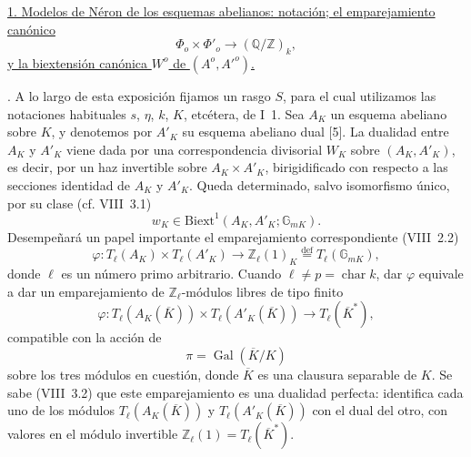 \par\medskip
\noindent
\underline{1. Modelos de Néron de los esquemas abelianos: notación; el
emparejamiento canónico}
\[
 \Phi_o\times\Phi'_o\longrightarrow(\mathbb Q/\mathbb Z)_k,
\]
\underline{y la biextensión canónica $W^o$ de $(A^o,{A'}^o)$.}

\medskip
{}. A lo largo de esta exposición fijamos un rasgo $S$, para el cual
utilizamos las notaciones habituales $s$, $\eta$, $k$, $K$, etcétera,
de I~1. Sea $A_K$ un esquema abeliano sobre $K$, y denotemos por $A'_K$
su esquema abeliano dual [5]. La dualidad entre $A_K$ y $A'_K$ viene
dada por una correspondencia divisorial $W_K$ sobre $(A_K,A'_K)$, es
decir, por un haz invertible sobre $A_K\times A'_K$, birigidificado con
respecto a las secciones identidad de $A_K$ y $A'_K$. Queda determinado,
salvo isomorfismo único, por su clase (cf. VIII~3.1)
\begin{equation}\tag{1.0.1}
 w_K\in\mathrm{Biext}^1(A_K,A'_K;\mathbb G_{mK}).
\end{equation}
Desempeñará un papel importante el emparejamiento correspondiente
(VIII~2.2)
\begin{equation}\tag{1.0.2}
 \varphi:T_\ell(A_K)\times T_\ell(A'_K)
 \longrightarrow\mathbb Z_\ell(1)_K
 \overset{\mathrm{def}}{=}T_\ell(\mathbb G_{mK}),
\end{equation}
donde $\ell$ es un número primo arbitrario. Cuando
$\ell\ne p=\operatorname{char}k$, dar $\varphi$ equivale a dar un
emparejamiento de $\mathbb Z_\ell$-módulos libres de tipo finito
\begin{equation}\tag{1.0.3}
 \varphi:T_\ell(A_K(\overline K))\times
 T_\ell(A'_K(\overline K))\longrightarrow T_\ell(\overline K^*),
\end{equation}
compatible con la acción de
\[
 \pi=\operatorname{Gal}(\overline K/K)
\]
sobre los tres módulos en cuestión, donde $\overline K$ es una clausura
separable de $K$. Se sabe (VIII~3.2) que este emparejamiento es una
dualidad perfecta: identifica cada uno de los módulos
$T_\ell(A_K(\overline K))$ y $T_\ell(A'_K(\overline K))$ con el dual
del otro, con valores en el módulo invertible
$\mathbb Z_\ell(1)=T_\ell(\overline K^*)$.

